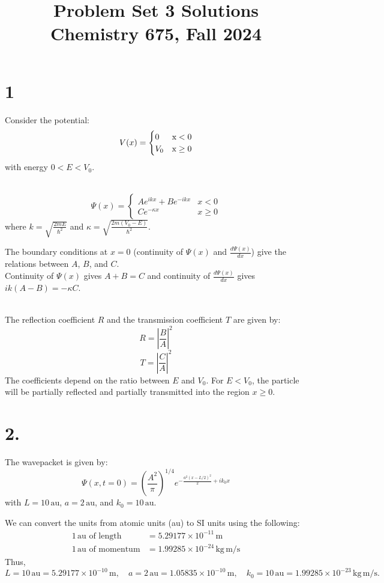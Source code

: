 \documentclass{article}
\title{Problem Set 3 Solutions\\ Chemistry 675, Fall 2024}
\date{}
\author{}
\begin{document}
\maketitle

\section*{1}

Consider the potential:
\[
V(x) = 
\begin{cases} 
    0 & \text x < 0 \\
    V_0 & \text x \geq 0
\end{cases}
\]
with energy $0 < E < V_0$.



\\
\[
\Psi(x) = 
\begin{cases} 
    Ae^{ikx} + Be^{-ikx} & x < 0 \\
    Ce^{-\kappa x} & x \geq 0
\end{cases}
\]
where $k = \sqrt{\frac{2mE}{\hbar^2}}$ and $\kappa = \sqrt{\frac{2m(V_0 - E)}{\hbar^2}}$.

The boundary conditions at $x = 0$ (continuity of $\Psi(x)$ and $\frac{d\Psi(x)}{dx}$) give the relations between $A$, $B$, and $C$.\\
Continuity of $\Psi(x)$ gives $A+B=C$ and continuity of $\frac{d\Psi(x)}{dx}$ gives $ik(A-B) = -\kappa C$.

\\
The reflection coefficient $R$ and the transmission coefficient $T$ are given by:
\[
R = \left| \frac{B}{A} \right|^2
\]
\[
T = \left| \frac{C}{A} \right|^2
\]
The coefficients depend on the ratio between $E$ and $V_0$. For $E < V_0$, the particle will be partially reflected and partially transmitted into the region $x \geq 0$.

\section*{2.}

The wavepacket is given by:
\[
\Psi(x, t = 0) = \left( \frac{A^2}{\pi} \right)^{1/4} e^{-\frac{a^2 (x - L/2)^2}{2} + ik_0 x }
\]
with $L = 10 \, \text{au}$, $a = 2 \, \text{au}$, and $k_0 = 10 \, \text{au}$.

We can convert the units from atomic units (au) to SI units using the following:
\begin{align*}
1 \, \text{au of length} & = 5.29177 \times 10^{-11} \, \text{m} \\
1 \, \text{au of momentum} & = 1.99285 \times 10^{-24} \, \text{kg} \, \text{m/s}
\end{align*}
Thus,
\[
L = 10 \, \text{au} = 5.29177 \times 10^{-10} \, \text{m}, \quad a = 2 \, \text{au} = 1.05835 \times 10^{-10} \, \text{m}, \quad k_0 = 10 \, \text{au} = 1.99285 \times 10^{-23} \, \text{kg} \, \text{m/s}.
\]
\end{document}

